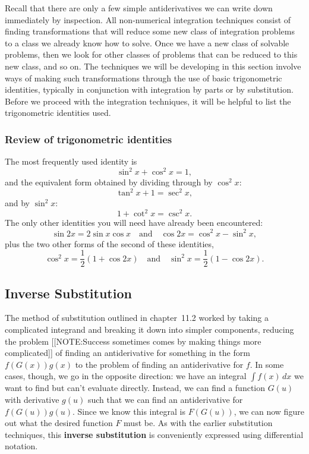 Recall that there are only a few simple antiderivatives we can write
down immediately by inspection.  All non-numerical integration
techniques consist of finding transformations that will reduce some
new class of integration problems to a class we already know how to
solve.  Once we have a new class of solvable problems, then we look
for other classes of problems that can be reduced to this new class,
and so on. The techniques we will be developing in this section
involve ways of making such transformations through the use of basic
trigonometric identities, typically in conjunction with integration by
parts or by substitution.  Before we proceed with the integration
techniques, it will be helpful to list the trigonometric identities
used.

\subsubsection{Review of trigonometric identities}
\label{subsubsec:review-of-trigonometric-identities}

The most frequently used identity is
\[
\sin^2{x} + \cos^2{x} =1,
\]
and the equivalent form obtained by dividing through by $\cos^2{x}$:
\[
\tan^2{x}+1=\sec^2{x},
\]
and by $\sin^2{x}$:
\[
1+\cot^2{x}=\csc^2{x}.
\] 
The only other identities you will need have already been encountered:
\[
\sin{2x}=2\sin{x}\cos{x}\quad \mbox{and}\quad 
     \cos{2x}=\cos^2{x}-\sin^2{x},
\]
plus the two other forms of the second of these identities,
\[
\cos^2{x}=\dfrac{1}{2}(1+\cos{2x})\quad \mbox{and}\quad
     \sin^2{x} =\dfrac{1}{2}(1-\cos{2x}).
\]

\subsection{Inverse Substitution}
\label{subsec:inverse-substitution}

The method of substitution outlined in chapter~11.2 worked by taking a
complicated integrand and breaking it down into simpler components,
reducing the problem 
[[NOTE:Success sometimes comes by making things more complicated]] 
of finding an antiderivative for something in the
form $f(G(x))g(x)$ to the problem of finding an antiderivative for
$f$.  In some cases, though, we go in the opposite direction: we have
an integral $\int f(x)\,dx$ we want to find but can't evaluate
directly.  Instead, we can find a function $G(u)$ with derivative
$g(u)$ such that we can find an antiderivative for $f(G(u))g(u)$.
Since we know this integral is $F(G(u))$, we can now figure out what
the desired function $F$ must be.  As with the earlier substitution
techniques, this {\bf inverse substitution} is conveniently expressed
using differential notation.





